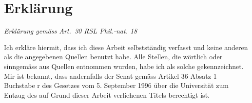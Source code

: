 \documentclass[a4paper,twoside,openright,11pt]{report}
\begin{document}

\nocite{*}



%
%




\chapter*{Erklärung}

\emph{Erklärung gemäss Art.~30 RSL Phil.-nat. 18}

\vspace*{1cm}

\noindent
Ich erkläre hiermit, dass ich diese Arbeit selbstständig verfasst und keine
anderen als die angegebenen Quellen benutzt habe. Alle Stellen, die
wörtlich oder sinngemäss aus Quellen entnommen wurden, habe ich als solche
gekennzeichnet. Mir ist bekannt, dass andernfalls der Senat gemäss Artikel
36 Absatz 1 Buchstabe r des Gesetzes vom 5. September 1996 über die
Universität zum Entzug des auf Grund dieser Arbeit verliehenen Titels
berechtigt ist.
\end{document}
